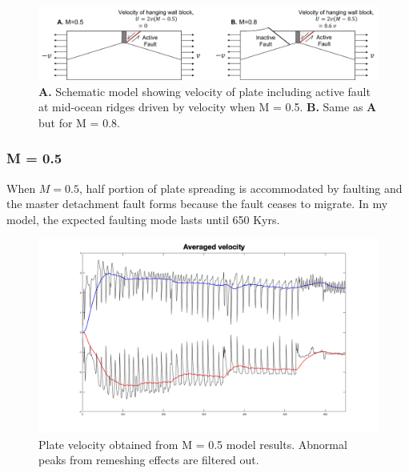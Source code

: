 \documentclass[letterpaper,12pt,notitle]{memphisthesis}                     %
\begin{document}

\begin{figure}[!htb]
	\centering
	\includegraphics[width=0.99\linewidth]{./figs/hangingwall.pdf}
	\caption{\textbf{A.} Schematic model showing velocity of plate including active fault at mid-ocean ridges driven by velocity when M = 0.5. \textbf{B.} Same as \textbf{A} but for M = 0.8. }
	\label{fig:hangingwall}
\end{figure}

\subsubsection{M = 0.5}

When $M=0.5$, half portion of plate spreading is accommodated by faulting and the master detachment fault forms because the fault ceases to migrate.
In my model, the expected faulting mode lasts until 650 Kyrs.


\begin{figure}[!htb]
	\centering
	\includegraphics[width=0.99\linewidth]{./figs/m05vel.png}
	\caption{Plate velocity obtained from M = 0.5 model results. Abnormal peaks from remeshing effects are filtered out.}
	\label{fig:m05vel}
\end{figure}
\end{document}
